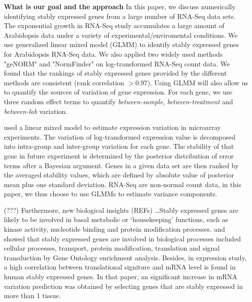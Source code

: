 \documentclass[11pt, a4paper]{article}
\begin{document}


\textbf{What is our goal and the approach} 
In this paper, we discuss numerically identifying stably expressed genes from a large
number of RNA-Seq data sets.
The exponential growth in RNA-Seq study accumulates a large amount of
Arabidopsis data under a variety of experimental/enviromental conditions. We
use generalized linear mixed model (GLMM) \citep{mccullagh1989generalized} to
identify stably expressed genes for Arabidopsis RNA-Seq data. 
We also applied two widely used methods "geNORM"
\citep{vandesompele2002accurate} and  "NormFinder"
\citep{andersen2004normalization} on log-transformed RNA-Seq count data.
We found that the rankings of stably expressed genes provided by the different
methods are consistent (rank correlation $> 0.97$).  Using GLMM will also
allow us to quantify the sources of variation of gene expression. For each
gene, we use three random effect terms to quantify \textit{between-sample},
\textit{between-treatment} and \textit{between-lab} variation. 

\cite{andersen2004normalization} used a linear mixed model to estimate
expression variation in microarray experiments. The variation of
log-transformed expression value is decomposed into intra-group and
inter-group variation for each gene. The stability of that gene in future
experiment is determined by the posterior distribution of error terms after a
Bayesian argument. Genes in a given data set are then ranked by the averaged
stability values, which are defined by absolute value of posterior mean plus
one standard deviation.  RNA-Seq are non-normal count data, in this paper, we
thus choose to use GLMMs to estimate variance components.

(???) Furthermore, new biological insights (REFs) \dots Stably expressed genes
are likely to be involved in basal metabolic or ‘housekeeping’ functions, such
as  kinase activity, nucleotide binding and protein modification processes.
\cite{sekhon2011genome} and \cite{wang2010dynamic} showed that stably
expressed genes are involved in biological processes included cellular
processes, transport, protein modification, translation and signal
transduction by Gene Ontology enrichment analysis. Besides, in expression
study, a high correlation between translational signiture and mRNA level is
found in human stably expressed genes\citep{line2013translational}. In that
paper, an significant increase in mRNA variation prediction was obtained by
selecting genes that are stably expressed in more than 1 tissue.\\
\end{document}
